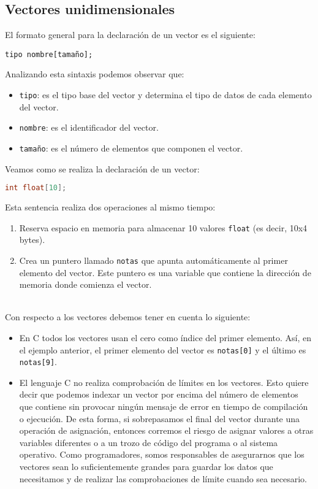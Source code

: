 \subsection{Vectores unidimensionales}{
El formato general para la declaración de un vector es el siguiente:

\texttt{tipo nombre[tamaño];}

Analizando esta sintaxis podemos observar que:
\begin{itemize}
	\item \texttt{tipo}: es el tipo base del vector y determina el tipo de datos de cada elemento del vector.
	\item \texttt{nombre}: es el identificador del vector.
	\item \texttt{tamaño}: es el número de elementos que componen el vector.
\end{itemize}
Veamos como se realiza la declaración de un vector:
\begin{Ejemplo}
\begin{lstlisting}[language=C]
int float[10];
\end{lstlisting}
\Explicacion
Esta sentencia realiza dos operaciones al mismo tiempo:
\begin{enumerate}
	\item Reserva espacio en memoria para almacenar 10 valores \texttt{float} (es decir, 10x4 bytes).
	\item Crea un puntero llamado \texttt{notas} que apunta automáticamente al primer elemento del vector. Este puntero es una variable que contiene la dirección de memoria donde comienza el vector.\\\\
\end{enumerate}
\end{Ejemplo}
Con respecto a los vectores debemos tener en cuenta lo siguiente:
\begin{itemize}
	\item En C todos los vectores usan el cero como índice del primer elemento. Así, en el ejemplo anterior, el primer elemento del vector es \texttt{notas[0]} y el último es \texttt{notas[9]}.
	\item El lenguaje C no realiza comprobación de límites en los vectores. Esto quiere decir que podemos indexar un vector por encima del número de elementos que contiene  sin provocar ningún mensaje de error en tiempo de compilación o ejecución. De esta forma, si sobrepasamos el final del vector durante una operación de asignación, entonces corremos el riesgo de asignar valores a otras variables diferentes o a un trozo de código del programa o al sistema operativo. Como programadores, somos responsables de asegurarnos que los vectores sean lo suficientemente grandes para guardar los datos que necesitamos y de realizar las comprobaciones de límite cuando sea necesario.
\end{itemize}
}
